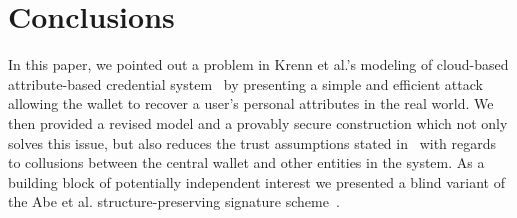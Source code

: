 \documentclass[runningheads]{llncs}
\begin{document}



\section{Conclusions}
 In this paper, we pointed out a problem in Krenn et al.'s modeling of cloud-based attribute-based credential system~\cite{towardsEABC} by presenting a simple and efficient attack allowing the wallet to recover a user's personal attributes in the real world.
We then provided a revised model and a provably secure construction which not only solves this issue, but also reduces the trust assumptions stated in~\cite{towardsEABC} with regards to collusions between the central wallet and other entities in the system.  
As a building block of potentially independent interest we presented a blind variant of the Abe et al. structure-preserving signature scheme~\cite{AGHO:2011}.
\end{document}
